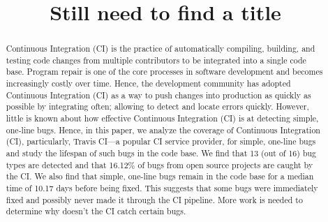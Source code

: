 \documentclass[10pt,conference]{IEEEtran}
\begin{document}
\title{Still need to find a title}


\author{
\and
{}
\and
{}
}

\maketitle

\begin{abstract}
Continuous Integration (CI) is the practice of automatically compiling, building, and testing code changes from multiple contributors to be integrated into a single code base. Program repair is one of the core processes in software development and becomes increasingly costly over time. Hence, the development community has adopted Continuous Integration (CI) as a way to push changes into production as quickly as possible by integrating often; allowing to detect and locate errors quickly. However, little is known about how effective Continuous Integration (CI) is at detecting simple, one-line bugs. Hence, in this paper, we analyze the coverage of Continuous Integration (CI), particularly, Travis CI---a popular CI service provider, for simple, one-line bugs and study the lifespan of such bugs in the code base. We find that 13 (out of 16) bug types are detected and that 16.12\% of bugs from open source projects are caught by the CI. We also find that simple, one-line bugs remain in the code base for a median time of 10.17 days before being fixed. This suggests that some bugs were immediately fixed and possibly never made it through the CI pipeline. More work is needed to determine why doesn't the CI catch certain bugs. 
\end{abstract}
\end{document}
